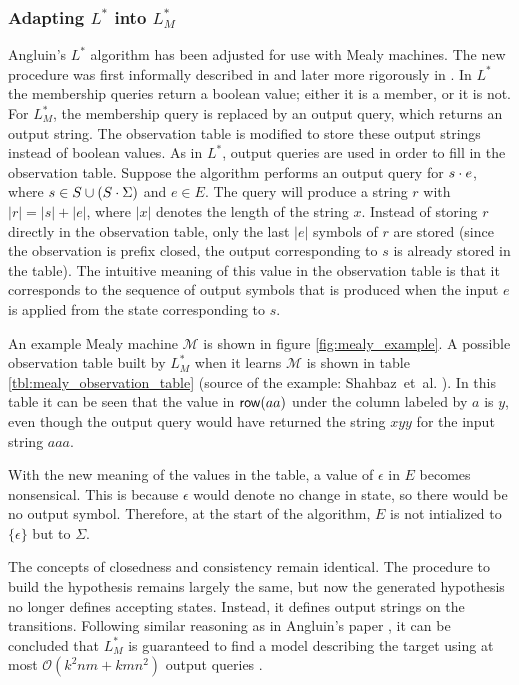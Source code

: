 \subsubsection {Adapting $L^*$ into $L^*_{M}$}
Angluin's $L^*$ algorithm has been adjusted for use with Mealy machines. The new
procedure was first informally described in \cite{Margaria2004} and later more
rigorously in \cite{Shahbaz2009}. In $L^*$ the membership queries return a
boolean value; either it is a member, or it is not. For $L^*_{M}$, the membership
query is replaced by an output query, which returns an output string. The
observation table is modified to store these output strings instead of boolean
values. As in $L^*$, output queries are used in order to fill in the observation
table. Suppose the algorithm performs an output query for $s \cdot e$, where
$s \in S \cup (S \cdot \Sigma)$ and $e \in E$. The query will produce a string
$r$ with $|r| = |s| + |e|$, where $|x|$ denotes the length of the string $x$.
Instead of storing $r$ directly in the observation table, only the last $|e|$
symbols of $r$ are stored (since the observation is prefix closed, the output
corresponding to $s$ is already stored in the table). The intuitive meaning of
this value in the observation table is that it corresponds to the sequence of
output symbols that is produced when the input $e$ is applied from the state
corresponding to $s$.

An example Mealy machine $\mathcal{M}$ is shown in figure
\ref{fig:mealy_example}. A possible observation table built by $L^*_M$ when it
learns $\mathcal{M}$ is shown in table \ref{tbl:mealy_observation_table} (source
of the example: Shahbaz~et~al. \cite{Shahbaz2009}). In this table it can be seen
that the value in $\mathsf{row}(aa)$ under the column labeled by $a$ is $y$, even though
the output query would have returned the string $xyy$ for the input string
$aaa$.

With the new meaning of the values in the table, a value of $\epsilon$ in $E$
becomes nonsensical. This is because $\epsilon$ would denote no change in
state, so there would be no output symbol. Therefore, at the start of the
algorithm, $E$ is not intialized to $\{\epsilon\}$ but to $\Sigma$.

The concepts of closedness and consistency remain identical. The procedure to
build the hypothesis remains largely the same, but now the generated hypothesis
no longer defines accepting states. Instead, it defines output strings on the
transitions. Following similar reasoning as in Angluin's paper
\cite{Angluin1987}, it can be concluded that $L^*_M$ is guaranteed to find a
model describing the target using at most $\mathcal{O}(k^2nm + kmn^2)$ output
queries \cite{Shahbaz2009}.

